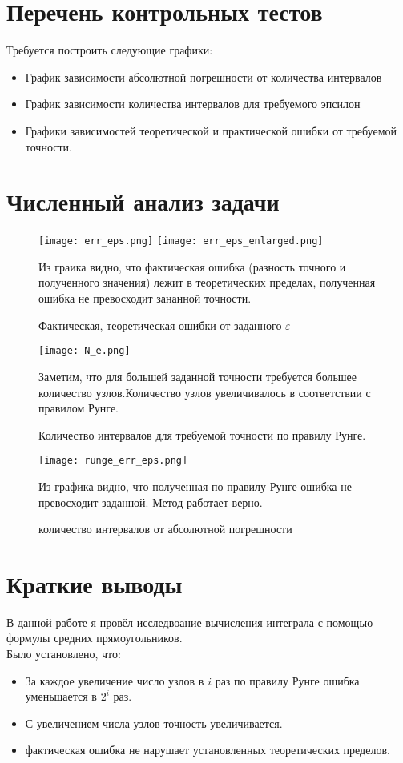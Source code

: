 \documentclass[12pt]{article}
\begin{document}
\section{Перечень контрольных тестов}
Требуется построить следующие графики:
\begin{itemize}
    \item График зависимости абсолютной погрешности от количества интервалов
    \item График зависимости количества интервалов для требуемого эпсилон
    \item Графики зависимостей теоретической и практической ошибки от требуемой точности.\\
\end{itemize}
\section{Численный анализ задачи}

\begin{figure}[h!]
\center
\texttt{[image: err\_eps.png]}
\texttt{[image: err\_eps\_enlarged.png]}
\caption{Фактическая, теоретическая ошибки от заданного $\varepsilon$}
Из граика видно, что фактическая ошибка (разность точного и полученного значения) лежит в теоретических пределах, полученная ошибка не превосходит зананной точности.\\
\end{figure}

\begin{figure}[h!]
\center
\texttt{[image: N\_e.png]}
\caption{Количество интервалов для требуемой точности по правилу Рунге.}
Заметим, что для большей заданной точности требуется большее количество узлов.Количество узлов увеличивалось в соответствии с правилом Рунге.\\
\end{figure}

\begin{figure}[h!]
\center
\texttt{[image: runge\_err\_eps.png]}
\caption{количество интервалов от абсолютной погрешности}
Из графика видно, что полученная по правилу Рунге ошибка не превосходит заданной. Метод работает верно.\\
\end{figure}
\newpage
\section{Краткие выводы}
В данной работе я провёл исследвоание вычисления интеграла с помощью формулы средних прямоугольников.\\
Было установлено, что:
\begin{itemize}
    \item За каждое увеличение число узлов в $i$ раз по правилу Рунге ошибка уменьшается в $2^i$ раз.
    \item С увеличением числа узлов точность увеличивается.
    \item фактическая ошибка не нарушает установленных теоретических пределов.
\end{itemize}
\end{document}
